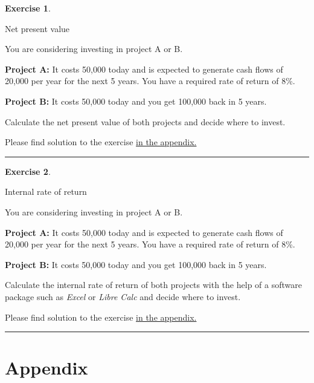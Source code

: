 \documentclass[
  12pt,
  oneside]{book}
\theoremstyle{definition}
\theoremstyle{definition}
\theoremstyle{definition}
\newtheorem{exercise}{Exercise}[chapter]
\theoremstyle{definition}
\theoremstyle{remark}
\begin{document}
\begin{exercise}
\protect\hypertarget{exr:netpresentvalue}{}\label{exr:netpresentvalue}

Net present value

You are considering investing in project A or B.

\textbf{Project A:} It costs 50,000 today and is expected to generate cash flows of 20,000 per year for the next 5 years. You have a required rate of return of 8\%.

\textbf{Project B:} It costs 50,000 today and you get 100,000 back in 5 years.

Calculate the net present value of both projects and decide where to invest.

Please find solution to the exercise \protect\hyperlink{sol:netpresentvalue}{in the appendix.}

\begin{center}\rule{0.5\linewidth}{0.5pt}\end{center}

\end{exercise}

\begin{exercise}
\protect\hypertarget{exr:irr}{}\label{exr:irr}

Internal rate of return

You are considering investing in project A or B.

\textbf{Project A:} It costs 50,000 today and is expected to generate cash flows of 20,000 per year for the next 5 years. You have a required rate of return of 8\%.

\textbf{Project B:} It costs 50,000 today and you get 100,000 back in 5 years.

Calculate the internal rate of return of both projects with the help of a software package such as \emph{Excel} or \emph{Libre Calc} and decide where to invest.

Please find solution to the exercise \protect\hyperlink{sol:irr}{in the appendix.}

\begin{center}\rule{0.5\linewidth}{0.5pt}\end{center}

\end{exercise}

\hypertarget{appendix}{%
\chapter{Appendix}\label{appendix}}
\end{document}
